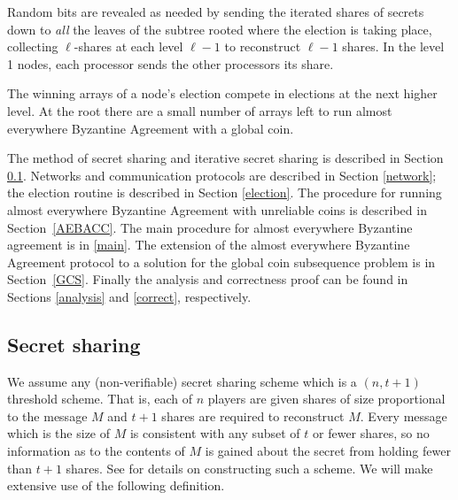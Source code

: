 \documentclass[letterpaper,11pt]{article}
\begin{document}
 Random bits are revealed as needed by sending the iterated shares of secrets down to {\it all}  the leaves of the subtree rooted where the election is taking place, collecting $\ell$-shares at each level $\ell-1$ to reconstruct $\ell-1$ shares.  In the level 1 nodes, each processor sends the other processors its share.

The winning arrays of a node's election compete in elections at the next higher level.
At the root there are a small number of arrays left to run almost everywhere Byzantine Agreement with a global coin.

The method of secret sharing and iterative secret sharing is described in Section \ref{secretsharing}.
Networks and communication protocols are described in Section \ref{network}; the election routine is described in Section \ref{election}.
The procedure for running almost everywhere Byzantine Agreement with unreliable coins is described in Section~\ref{AEBACC}.  The main procedure for almost everywhere Byzantine agreement is in \ref{main}.  The extension of the almost everywhere Byzantine Agreement protocol to a solution for  the global coin subsequence problem is in Section~\ref{GCS}.  Finally the analysis and correctness proof can be found in Sections \ref{analysis} and \ref{correct}, respectively.



\subsection{Secret sharing} \label{secretsharing}

We assume any (non-verifiable) secret sharing scheme which is a $(n, t+1)$  threshold scheme. That is, each of $n$ players are given shares of size
proportional to the message $M$ and $t+1$ shares are required to reconstruct $M$. Every message which is the size of $M$ is consistent with any subset of $t$ or fewer shares, so no information as to the contents of $M$ is gained about the secret from holding fewer than $t+1$ shares. See \cite{crypto} for details on constructing such a scheme.  We will make extensive use of the following definition.
\end{document}
